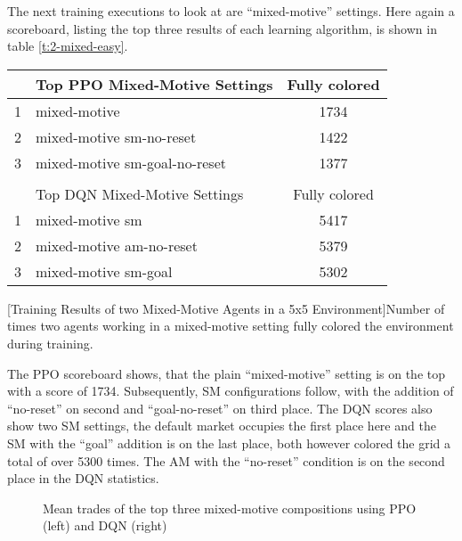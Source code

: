 The next training executions to look at are ``mixed-motive'' settings. Here again a scoreboard, listing the top three results of each learning algorithm, is shown in table \ref{t:2-mixed-easy}.
\begin{center}
    \begin{tabular}{clc}\hline
         & Top PPO Mixed-Motive Settings & Fully colored \\ \hline
        {\small 1} & mixed-motive & 1734 \\
        {\small 2} & mixed-motive sm-no-reset & 1422 \\
        {\small 3} & mixed-motive sm-goal-no-reset & 1377 \\ \hline
         &   \\ \hline
         & Top DQN Mixed-Motive Settings & Fully colored \\ \hline
        {\small 1} & mixed-motive sm & 5417 \\
        {\small 2} & mixed-motive am-no-reset & 5379 \\
        {\small 3} & mixed-motive sm-goal & 5302 \\ \hline
        \end{tabular}
        [Training Results of two Mixed-Motive Agents in a 5x5 Environment]{Number of times two agents working in a mixed-motive setting fully colored the environment during training.}\label{t:2-mixed-easy}
    \end{center}

The PPO scoreboard shows, that the plain ``mixed-motive'' setting is on the top with a score of 1734. Subsequently, SM configurations follow, with the addition of ``no-reset'' on second and ``goal-no-reset'' on third place. The DQN scores also show two SM settings, the default market occupies the first place here and the SM with the ``goal'' addition is on the last place, both however colored the grid a total of over 5300 times. The AM with the ``no-reset'' condition is on the second place in the DQN statistics.

\begin{figure}[hpbt]
    \centering
    \hspace{0.01\textwidth}
    \caption[Mean Trades of the Top Mixed-Motive Modes]{Mean trades of the top three mixed-motive compositions using PPO (left) and DQN (right)}
    \label{fig:multipic_plots_mixed_easy} %
\end{figure}

